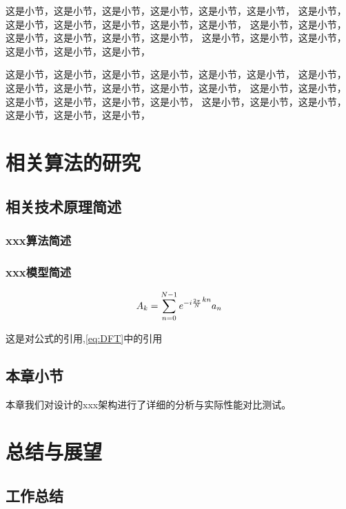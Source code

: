 \documentclass[UTF8,openright]{ctexbook}
\begin{document}
这是小节，这是小节，这是小节，这是小节，这是小节，这是小节，
这是小节，这是小节，这是小节，这是小节，这是小节，这是小节，
这是小节，这是小节，这是小节，这是小节，这是小节，这是小节，
这是小节，这是小节，这是小节，这是小节，这是小节，这是小节，

这是小节，这是小节，这是小节，这是小节，这是小节，这是小节，
这是小节，这是小节，这是小节，这是小节，这是小节，这是小节，
这是小节，这是小节，这是小节，这是小节，这是小节，这是小节，
这是小节，这是小节，这是小节，这是小节，这是小节，这是小节，

\clearpage %

\chapter {相关算法的研究}


\section {相关技术原理简述}


\subsection {xxx算法简述}\label{section:acoustic-feat}

\subsection {xxx模型简述}



\begin{equation}
\label{eq:DFT}
A_k = \sum_{n=0}^{N-1} {e^{-i {2 \pi \over N}}}^{kn} a_n 
\end{equation}


这是对公式的引用,\autoref{eq:DFT}中的引用

\section{本章小节}

本章我们对设计的xxx架构进行了详细的分析与实际性能对比测试。



\chapter {总结与展望}

\section {工作总结}
\end{document}
